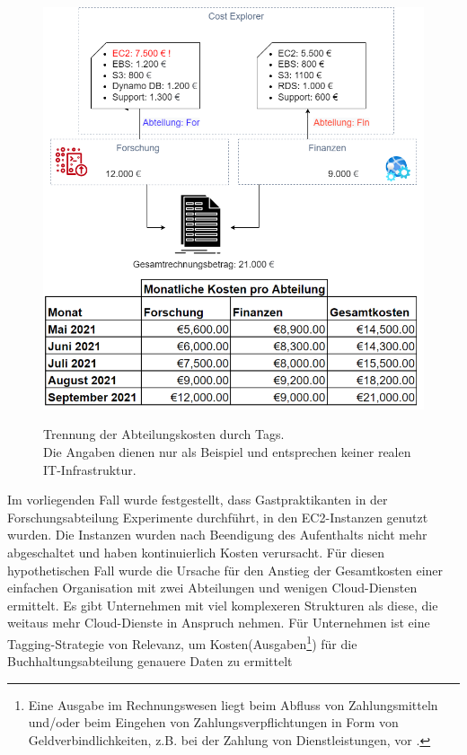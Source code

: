 \begin{figure}[h!]
  \centering
  \includegraphics[scale=0.5]{sources/BA Diagramme-Nach Abteilung.drawio}
  \caption[Trennung der Kosten durch Tags]{}
  \label{fig:BA Diagramme-Nach Abteilung.drawio} 
  Trennung der Abteilungskosten durch Tags.\\
  Die Angaben dienen nur als Beispiel und entsprechen keiner realen IT-Infrastruktur.
\end{figure} Im vorliegenden Fall wurde festgestellt, dass Gastpraktikanten in der Forschungsabteilung Experimente durchführt, in den EC2-Instanzen genutzt wurden. Die Instanzen wurden nach Beendigung des Aufenthalts nicht mehr abgeschaltet und haben kontinuierlich Kosten verursacht.
Für diesen hypothetischen Fall wurde die Ursache für den Anstieg der Gesamtkosten einer einfachen Organisation mit zwei Abteilungen und wenigen Cloud-Diensten ermittelt. Es gibt Unternehmen mit viel komplexeren Strukturen als diese, die weitaus mehr Cloud-Dienste in Anspruch nehmen. Für Unternehmen ist eine Tagging-Strategie von Relevanz, um Kosten(Ausgaben\footnote{Eine Ausgabe im Rechnungswesen liegt beim Abfluss von Zahlungsmitteln und/oder beim Eingehen von Zahlungsverpflichtungen in Form von Geldverbindlichkeiten, z.B. bei der Zahlung von Dienstleistungen, vor \cite{AUS}.}) für die Buchhaltungsabteilung genauere Daten zu ermittelt %
